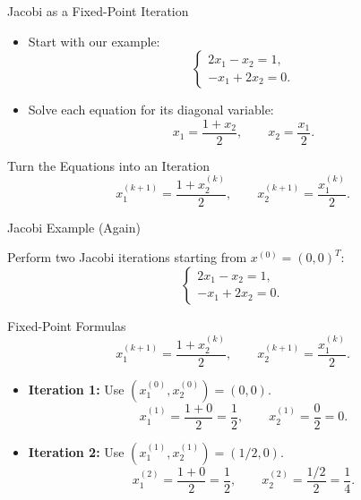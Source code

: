 \documentclass[10pt]{beamer}
\begin{document}
\begin{frame}{Jacobi as a Fixed-Point Iteration}

\begin{itemize}
    \item Start with our example:
    \[
        \begin{cases}
            2x_1-x_2=1,\\
            -x_1+2x_2=0.
        \end{cases}
    \]

    \item Solve each equation for its diagonal variable:
    \[
        x_1=\frac{1+x_2}{2},
        \qquad
        x_2=\frac{x_1}{2}.
    \]
\end{itemize}

\begin{block}{Turn the Equations into an Iteration}
\[
    \boxed{x_1^{(k+1)}=\frac{1+x_2^{(k)}}{2}},
    \qquad
    \boxed{x_2^{(k+1)}=\frac{x_1^{(k)}}{2}}.
\]
\end{block}



\end{frame}

\begin{frame}[shrink]{Jacobi Example (Again)}

\begin{example}
Perform two Jacobi iterations starting from
$x^{(0)}=(0,0)^T$:
\[
    \begin{cases}
        2x_1-x_2=1,\\
        -x_1+2x_2=0.
    \end{cases}
\]
\end{example}

\begin{block}{Fixed-Point Formulas}
\[
    x_1^{(k+1)}=\frac{1+x_2^{(k)}}{2},
    \qquad
    x_2^{(k+1)}=\frac{x_1^{(k)}}{2}.
\]
\end{block}

\begin{itemize}
    \item \textbf{Iteration 1:} Use $(x_1^{(0)},x_2^{(0)})=(0,0)$.
    \[
        x_1^{(1)}=\frac{1+0}{2}=\frac12,
        \qquad
        x_2^{(1)}=\frac{0}{2}=0.
    \]

    \item \textbf{Iteration 2:} Use $(x_1^{(1)},x_2^{(1)})=(1/2,0)$.
    \[
        x_1^{(2)}=\frac{1+0}{2}=\frac12,
        \qquad
        x_2^{(2)}=\frac{1/2}{2}=\frac14.
    \]
\end{itemize}
\end{frame}
\end{document}

